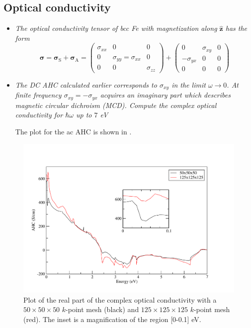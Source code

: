 \subsection*{Optical conductivity}
\begin{itemize}
	\item {\it The optical conductivity tensor of bcc Fe with magnetization along $\hat{\mathbf{z}}$ has the form }
\begin{equation}
\boldsymbol{\sigma} = \boldsymbol{\sigma}_\mathrm{S} + \boldsymbol{\sigma}_{\mathrm{A}} =
\begin{pmatrix}
\sigma_{xx} & 0                       & 0 \\
 0          & \sigma_{yy}=\sigma_{xx}  & 0 \\
 0          &  0                     & \sigma_{zz}
\end{pmatrix} + \begin{pmatrix} 0 & \sigma_{xy} & 0 \\ -\sigma_{yx} & 0 & 0 \\ 0 & 0 & 0 \end{pmatrix}
\end{equation}

	\item {\it
The DC AHC calculated earlier corresponds to $\sigma_{xy}$ in the limit $\omega \rightarrow 0$. At finite frequency $\sigma_{xy} = -\sigma_{yx}$ acquires
an imaginary part which describes magnetic circular dichroism (MCD).
Compute the complex optical conductivity for $\hbar\omega$ up to $7$ eV
}

The plot for the ac AHC is shown in .

\end{itemize}
\begin{figure}[t!]
\centering
\includegraphics[width=0.7\columnwidth]{figure/example18/Fe-kubo_A_xy_125.pdf}
\caption{Plot of the real part of the complex optical conductivity with a $50\times50\times50$ $k$-point mesh (black) and $125\times125\times125$ $k$-point mesh (red). The inset is a magnification of the region [0-0.1] eV.}\label{fig18.4}
\end{figure}

